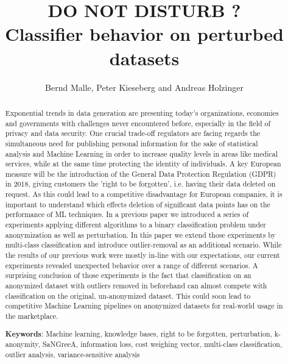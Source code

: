 \documentclass{llncs}
\begin{document}
\title{DO NOT DISTURB ? \\ Classifier behavior on perturbed datasets}

\author{Bernd Malle, Peter Kieseberg and Andreas Holzinger}

	
\maketitle

\begin{abstract}

Exponential trends in data generation are presenting today's organizations, economies and governments with challenges never encountered before, especially in the field of privacy and data security. One crucial trade-off regulators are facing regards the simultaneous need for publishing personal information for the sake of statistical analysis and Machine Learning in order to increase quality levels in areas like medical services, while at the same time protecting the identity of individuals. A key European measure will be the introduction of the General Data Protection Regulation (GDPR) in 2018, giving customers the 'right to be forgotten', i.e. having their data deleted on request. As this could lead to a competitive disadvantage for European companies, it is important to understand which effects deletion of significant data points has on the performance of ML techniques. In a previous paper we introduced a series of experiments applying different algorithms to a binary classification problem under anonymization as well as perturbation. In this paper we extend those experiments by multi-class classification and introduce outlier-removal as an additional scenario. While the results of our previous work were mostly in-line with our expectations, our current experiments revealed unexpected behavior over a range of different scenarios. A surprising conclusion of those experiments is the fact that classification on an anonymized dataset with outliers removed in beforehand can almost compete with classification on the original, un-anonymized dataset. This could soon lead to competitive Machine Learning pipelines on anonymized datasets for real-world usage in the marketplace.


\medskip

\textbf{Keywords}: Machine learning, knowledge bases, right to be forgotten, perturbation, k-anonymity, SaNGreeA, information loss, cost weighing vector, multi-class classification, outlier analysis, variance-sensitive analysis


\end{abstract}
\end{document}
